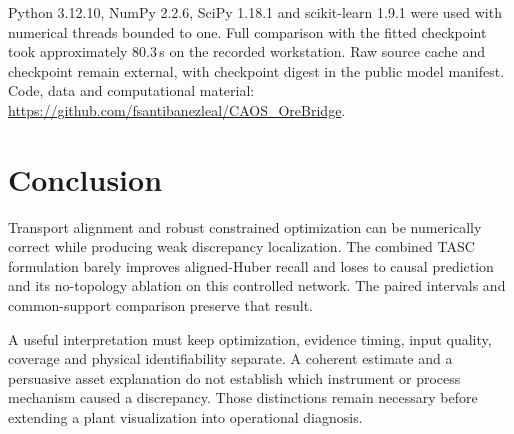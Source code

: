 \documentclass[11pt,a4paper]{article}
\begin{document}
Python 3.12.10, NumPy 2.2.6, SciPy 1.18.1 and scikit-learn 1.9.1 were used with numerical threads bounded to one. Full comparison with the fitted checkpoint took approximately 80.3\,s on the recorded workstation. Raw source cache and checkpoint remain external, with checkpoint digest in the public model manifest. Code, data and computational material: \url{https://github.com/fsantibanezleal/CAOS_OreBridge}.

\section{Conclusion}
Transport alignment and robust constrained optimization can be numerically correct while producing weak discrepancy localization. The combined TASC formulation barely improves aligned-Huber recall and loses to causal prediction and its no-topology ablation on this controlled network. The paired intervals and common-support comparison preserve that result.

A useful interpretation must keep optimization, evidence timing, input quality, coverage and physical identifiability separate. A coherent estimate and a persuasive asset explanation do not establish which instrument or process mechanism caused a discrepancy. Those distinctions remain necessary before extending a plant visualization into operational diagnosis.


\end{document}
